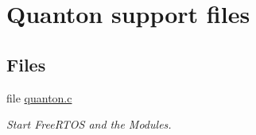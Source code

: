 \hypertarget{group___quanton}{\section{\-Quanton support files}
\label{group___quanton}
}
\subsection*{\-Files}
\begin{DoxyCompactItemize}
\item 
file \hyperlink{quanton_8c}{quanton.\-c}
\begin{DoxyCompactList}\small\item\em \-Start \-Free\-R\-T\-O\-S and the \-Modules. \end{DoxyCompactList}\end{DoxyCompactItemize}
